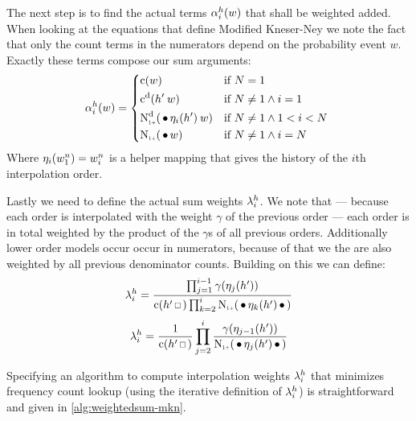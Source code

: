 The next step is to find the actual terms $\alpha_i^h(w)$ that shall be
weighted added.
When looking at the equations that define Modified Kneser-Ney we note the fact
that only the count terms in the numerators depend on the probability event $w$.
Exactly these terms compose our sum arguments:
\begin{equation}
  \SumArg_i^h(w) =
    \begin{dcases*}
      \Count(w)                                              & if $N = 1$ \\
      \DiscountedCount(\SeenHistory \: w)                    & if $N \neq 1 \land i = 1$ \\
      \DiscountedCount*(\WSkp \History_i(\SeenHistory) \: w) & if $N \neq 1 \land 1 < i < N$ \\
      \ContCountIp(\WSkp w)                                  & if $N \neq 1 \land i = N$
    \end{dcases*}
\end{equation}
Where $\eta_i(w_1^n) = w_i^n$ is a helper mapping that gives the history
of the $i$th interpolation order.

Lastly we need to define the actual sum weights $\lambda_i^h$.
We note that --- because each order is interpolated with the weight $\gamma$ of
the previous order --- each order is in total weighted by the product of the
$\gamma$s of all previous orders.
Additionally lower order models occur occur in numerators, because of that we
the are also weighted by all previous denominator counts.
Building on this we can define:
\begin{equation}
  \SumWeight_i^h = \frac{\prod_{j = 1}^{i - 1} \gamma(\History_j(\SeenHistory))}
                        {\Count(\SeenHistory \Skp) \prod_{k = 2}^{i} \ContCountIp(\WSkp \History_k(\SeenHistory) \WSkp)}
\end{equation}
\begin{equation}
  \SumWeight_i^h = \frac{1}{\Count(\SeenHistory \Skp)} \prod_{j = 2}^i \frac{\gamma(\History_{j-1}(\SeenHistory))}{\ContCountIp(\WSkp \History_j(\SeenHistory) \WSkp)}
\end{equation}


Specifying an algorithm to compute interpolation weights $\lambda_i^h$ that
minimizes frequency count lookup (using the iterative definition of
$\lambda_i^h$) is straightforward and given in \cref{alg:weightedsum-mkn}.

